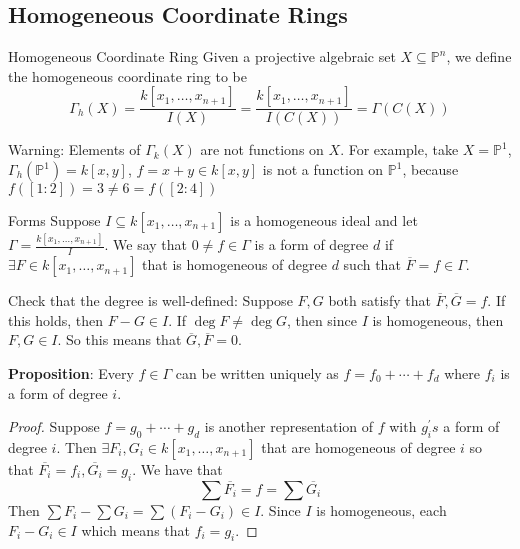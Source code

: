 \documentclass{report}
\begin{document}
\begin{topic}
    \section{Homogeneous Coordinate Rings}
\end{topic}

\begin{definition}{Homogeneous Coordinate Ring}
    Given a projective algebraic set $X \subseteq \mathbb{P}^{n}$, we define the homogeneous coordinate ring to be
        \begin{equation*}
            \Gamma_{h}(X) = \dfrac{k[x_{1}, \ldots, x_{n + 1}]}{I(X)} = \dfrac{k[x_{1}, \ldots, x_{n + 1}]}{I(C(X))} =  \Gamma (C(X))
        \end{equation*}
\end{definition}

Warning: Elements of $\Gamma_{k}(X)$ are not functions on $X$. For example, take $X = \mathbb{P}^{1}$, $\Gamma_{h}(\mathbb{P}^{1}) = k[x, y]$, $f = x + y \in k[x, y]$ is not a function on $\mathbb{P}^{1}$, because $f([1 : 2]) = 3 \neq 6 = f([2 : 4])$

\begin{definition}{Forms}
    Suppose $I \subseteq k[x_{1}, \ldots, x_{n + 1}]$ is a homogeneous ideal and let $\Gamma = \frac{k[x_{1}, \ldots, x_{n + 1}]}{I}$. We say that $0 \neq f \in \Gamma$ is a form of degree $d$ if $\exists F \in k[x_{1}, \ldots, x_{n + 1}]$ that is homogeneous of degree $d$ such that $\overline{F} = f  \in \Gamma$.
\end{definition}

Check that the degree is well-defined: Suppose $F, G$ both satisfy that $\overline{F}, \overline{G} = f$. If this holds, then $F - G \in I$. If $\deg F \neq \deg G$, then since $I$ is homogeneous, then $F, G \in I$. So this means that $\overline{G}, \overline{F} = 0$.

\textbf{Proposition}: Every $f \in \Gamma$ can be written uniquely as $f = f_{0} + \cdots + f_{d}$ where $f_{i}$ is a form of degree $i$.
    \begin{proof}
        Suppose $f = g_{0} + \cdots + g_{d}$ is another representation of $f$ with $g_{i}^{\prime}s $ a form of degree $i$. Then $\exists F_{i}, G_{i} \in k[x_{1}, \ldots, x_{n + 1}]$ that are homogeneous of degree $i$ so that $\overline{F_{i}} = f_{i}, \overline{G_{i}} = g_{i}$. We have that
            \begin{equation*}
                \sum \overline{F_{i}} = f = \sum \overline{G_{i}}
            \end{equation*}
        Then $\sum F_{i} - \sum G_{i} = \sum (F_{i} - G_{i}) \in I$. Since $I$ is homogeneous, each $F_{i} - G_{i} \in I$ which means that $f_{i} = g_{i}$.
    \end{proof}
\end{document}
